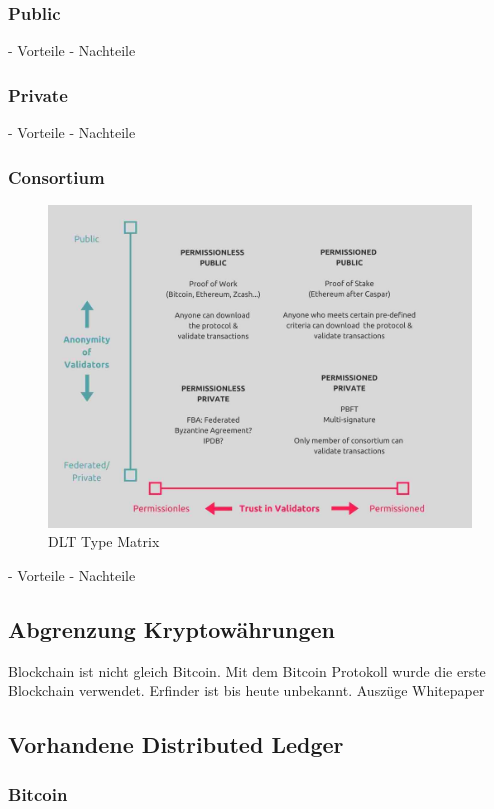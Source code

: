 \subsubsection{Public}
- Vorteile
- Nachteile

\subsubsection{Private}
- Vorteile
- Nachteile

\subsubsection{Consortium}
\begin{figure}[h!]
	\centering
	\includegraphics[width=1.0\linewidth]{pictures/dlt-type-matrix}
	\caption[DLT Type Matrix]{DLT Type Matrix}
	\label{fig:dlt-type-matrix}
\end{figure}
- Vorteile
- Nachteile

\subsection{Abgrenzung Kryptowährungen}
Blockchain ist nicht gleich Bitcoin. Mit dem Bitcoin Protokoll wurde die erste Blockchain verwendet. Erfinder ist bis heute unbekannt. Auszüge Whitepaper

\subsection{Vorhandene Distributed Ledger}


\subsubsection{Bitcoin}


